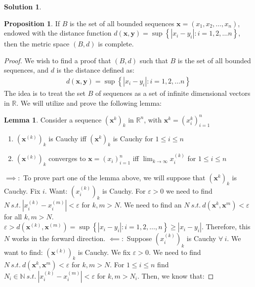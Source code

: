 \documentclass[12pt]{article}
\theoremstyle{definition} %
\newtheorem{solution}{Solution}
\newtheorem*{proposition}{Proposition}
\newtheorem{lemma}{Lemma}
\theoremstyle{plain} %
\begin{document}
\begin{solution}
    \begin{proposition}
        If $B$ is the set of all bounded sequences $\mathbf{x} = (x_{1}, x_{2}, \ldots, x_n )$, endowed with the distance function $d(\mathbf{x}, \mathbf{y})=\sup \left\{ \left\vert x_i - y_{i} \right\vert : i=1,2, \ldots n \right\}$, then the metric space $(B,d)$ is complete.
    \end{proposition}
    \begin{proof}

        We wish to find a proof that $(B, d)$ such that $B$ is the set of all bounded sequences, and $d$ is the distance defined as:
        \begin{align}
            d(\mathbf{x}, \mathbf{y})=\sup \left\{ \left\vert x_i - y_{i} \right\vert : i=1,2, \ldots n \right\} 
        \end{align} 
        The idea is to treat the set $B$ of sequences as a set of infinite dimensional vectors in $\mathbb{{R}} $. 
        We will utilize and prove the following lemma: 
        \begin{lemma}
                Consider a sequence $(\mathbf{x}^{k})_k$ in $\mathbb{{R}}^n$, with $\mathbf{x}^{k}=(x_i^{k})^{n}_{i=1}$   
            \begin{enumerate}
                \item $(\textbf{x}^{(k)})_{k}$ is Cauchy iff $(\textbf{x}^{k})_{k}$  is Cauchy for $1 \leq i \leq n $
                \item $(\textbf{x}^{(k)})_{k}$ converges to $\mathbf{x} = (x_{i})^{n}_{i=1}$ iff $\lim_{k \to \infty} x_{i}^{(k)}$ for $1 \leq i \leq n $ 
            \end{enumerate} 
        \end{lemma}
        \noindent
       $\implies :$  To prove part one of the lemma above, we will suppose that $(\textbf{x}^{k})_{k}$ is Cauchy. Fix $i$. Want: $(x_{i}^{(k)})_{k}$ is Cauchy. For $\varepsilon > 0$ we need to find $N\ s.t. \ \left\vert x_{i}^{(k)} - x_{i}^{(m)} \right\vert <\varepsilon $ for $k, m>N$. We need to find an $N\ s.t. \ d(\mathbf{x}^{k}, \mathbf{x}^{m})<\varepsilon$ for all $k,m>N$. $\varepsilon > d(\mathbf{x}^{(k)}, \mathbf{x}^{(m)})=\sup \left\{ \left\vert  x_{i}- y_{i}\right\vert : i= 1,2, \ldots , n   \right\} \geq \left\vert x_{i}-y_{i} \right\vert $. Therefore, this $N$ works in the forward direction.
        $\impliedby :$ Suppose $(x_{i}^{(k)})_{k}$ is Cauchy $\forall \ i$. We want to find: $(\mathbf{x}^{(k)})_{k}$ is Cauchy. We fix $\varepsilon >0$. We need to find $N\ s.t. \ d(\mathbf{x}^{k}, \mathbf{x}^{m})<\varepsilon $ for $k, m>N$. For $1\leq i\leq n$ find $N_{i} \in \mathbb{{N}} \ s.t. \ \left\vert x_{i}^{(k)}- x_{i}^{(m)} \right\vert < \varepsilon$ for $k,m>N_{i} $. Then, we know that:

\end{proof}
\end{solution}
\end{document}
